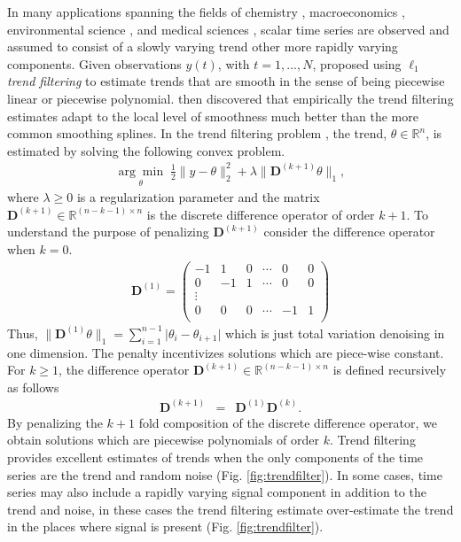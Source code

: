\documentclass[12pt]{article}
\begin{document}
	In many applications spanning the fields of chemistry \citep{Ning2014}, macroeconomics \citep{yamada2017estimating}, environmental science \citep{brantley2014mobile}, and medical sciences \citep{pettersson2013algorithm, marandi2015qualitative}, scalar time series are observed and assumed to consist of a slowly varying trend other more rapidly varying components. Given observations $y(t)$, with $t=1, ..., N$, \cite{Kim2009} proposed using \textit{$\ell_1$ trend filtering} to estimate trends that are smooth in the sense of being piecewise linear or piecewise polynomial. \cite{Tib2014} then discovered that empirically the trend filtering estimates adapt to the local level of smoothness much better than the more common smoothing splines. In the trend filtering problem \citep{Kim2009, Tib2014}, the trend, $\theta \in \mathbb{R}^n$, is estimated by solving the following convex problem.
	\begin{eqnarray}
	\underset{\theta}{\arg\min}\; \frac{1}{2} \lVert y - \theta \rVert_2^2 + \lambda \lVert \mathbf{D}^{(k+1)}\theta \rVert_1,
	\end{eqnarray}
	where $\lambda \geq 0$ is a regularization parameter and the matrix $\mathbf{D}^{(k+1)} \in \mathbb{R}^{(n - k -1) \times n}$ is the discrete difference operator of order $k+1$. To understand the purpose of penalizing $\mathbf{D}^{(k+1)}$ consider the difference operator when $k = 0$.
	\begin{eqnarray}
	\mathbf{D}^{(1)} = \begin{pmatrix}
	-1 & 1 & 0 & \cdots & 0 & 0 \\
	0 & -1 & 1 & \cdots & 0 & 0 \\
	\vdots & & & & & \\
	0 & 0 & 0 & \cdots & -1 & 1 \\
	\end{pmatrix}
	\end{eqnarray}
	Thus, $\lVert \mathbf{D}^{(1)}\theta \rVert_1 = \sum_{i=1}^{n-1} \lvert \theta_i - \theta_{i+1} \rvert$ which is just total variation denoising in one dimension. The penalty incentivizes solutions which are piece-wise constant. For $k \geq 1$, the difference operator $\mathbf{D}^{(k+1)} \in \mathbb{R}^{(n-k-1) \times n}$ is defined recursively as follows
	\begin{eqnarray}
	\mathbf{D}^{(k+1)} & = & \mathbf{D}^{(1)}\mathbf{D}^{(k)}.
	\end{eqnarray}
	By penalizing the $k+1$ fold composition of the discrete difference operator, we obtain solutions which are piecewise polynomials of order $k$. Trend filtering provides excellent estimates of trends when the only components of the time series are the trend and random noise (Fig. \ref{fig:trendfilter}). In some cases, time series may also include a rapidly varying signal component in addition to the trend and noise, in these cases the trend filtering estimate over-estimate the trend in the places where signal is present (Fig. \ref{fig:trendfilter}).  
	   	
\end{document}
